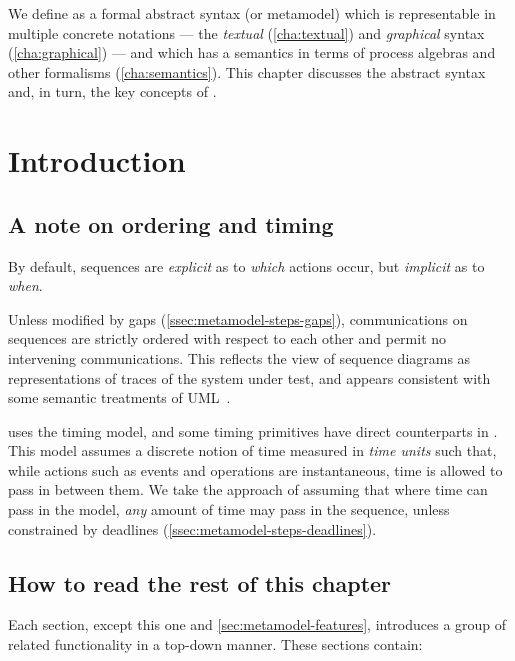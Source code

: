 

We define \langname{} as a formal abstract syntax (or
metamodel) which is representable in multiple concrete notations ---
the \emph{textual} (\cref{cha:textual}) and \emph{graphical}
syntax (\cref{cha:graphical}) --- and which has a semantics in terms
of process algebras and other formalisms (\cref{cha:semantics}).  This
chapter discusses the abstract syntax and, in turn, the key concepts
of \langname.

\section{Introduction}\label{sec:metamodel-intro}

\subsection{A note on ordering and timing}\label{ssec:metamodel-intro-ordering}

By default, \langname{} sequences are \emph{explicit}
as to \emph{which} actions occur, but \emph{implicit} as to
\emph{when}.

Unless modified by gaps (\cref{ssec:metamodel-steps-gaps}),
communications on \langname{} sequences are strictly ordered with
respect to each other and permit no intervening communications.  This
reflects the view of sequence diagrams as representations of traces of
the system under test, and appears consistent with some semantic
treatments of UML~\cite{lima-semantics}.  

\langname{} uses the \robochart{} timing model, and some \robochart{}
timing primitives have direct counterparts in \langname.  This model
assumes a discrete notion of time measured in \emph{time units} such
that, while actions such as events and operations are instantaneous,
time is allowed to pass in between them.  We take the approach of
assuming that where time can pass in the \robochart{} model,
\emph{any} amount of time may pass in the sequence, unless
constrained by deadlines (\cref{ssec:metamodel-steps-deadlines}).


\subsection{How to read the rest of this chapter}\label{ssec:metamodel-intro-readme}

Each section, except this one and \cref{sec:metamodel-features},
introduces a group of related \langname{}
functionality in a top-down manner.  These sections contain:

